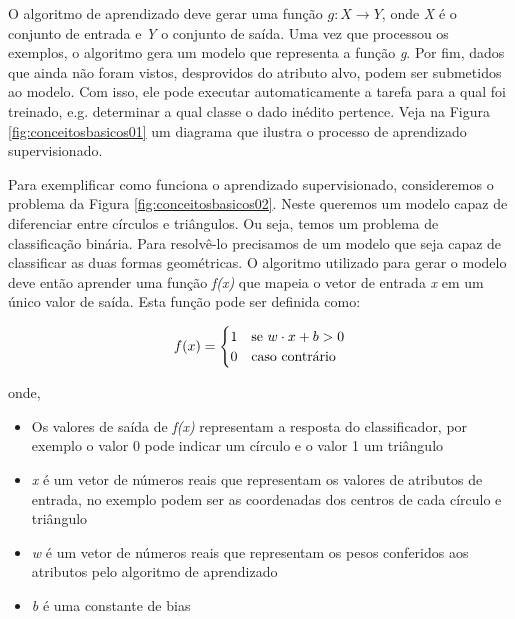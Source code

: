O algoritmo de aprendizado deve gerar uma função $g: X \to Y$, onde \textit{X} é o conjunto de entrada e \textit{Y} o conjunto de saída.
Uma vez que processou os exemplos, o algoritmo gera um modelo que representa a função \textit{g}.
Por fim, dados que ainda não foram vistos, desprovidos do atributo alvo, podem ser submetidos ao modelo.
Com isso, ele pode executar automaticamente a tarefa para a qual foi treinado, e.g. determinar a qual classe o dado inédito pertence.
Veja na Figura \ref{fig:conceitosbasicos01} um diagrama que ilustra o processo de aprendizado supervisionado.

Para exemplificar como funciona o aprendizado supervisionado, consideremos o problema da Figura \ref{fig:conceitosbasicos02}.
Neste queremos um modelo capaz de diferenciar entre círculos e triângulos.
Ou seja, temos um problema de classificação binária.
Para resolvê-lo precisamos de um modelo que seja capaz de classificar as duas formas geométricas.
O algoritmo utilizado para gerar o modelo deve então aprender uma função \textit{f(x)} que mapeia o vetor de entrada \textit{x} em um único valor de saída. Esta função pode ser definida como:

\begin{equation*}
\centering
f(x) =
        \begin{cases}
        1 & \text{se }w \cdot x + b > 0\\
        0 & \text{caso contrário}
        \end{cases}
\end{equation*}

onde,
\begin{itemize}
\item Os valores de saída de \textit{f(x)} representam a resposta do classificador, por exemplo o valor 0 pode indicar um círculo e o valor 1 um triângulo
\item \textit{x} é um vetor de números reais que representam os valores de atributos de entrada, no exemplo podem ser as coordenadas dos centros de cada círculo e triângulo
\item \textit{w} é um vetor de números reais que representam os pesos conferidos aos atributos pelo algoritmo de aprendizado
\item \textit{b} é uma constante de bias
\end{itemize}

